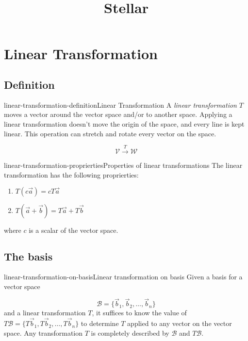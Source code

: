 \documentclass[preview]{standalone}
\begin{document}
\title{Stellar}
\genpage

\section{Linear Transformation}

\subsection{Definition}

\begin{snippetdefinition}{linear-transformation-definition}{Linear Transformation}
    A \textit{linear transformation} \(T\) moves a vector around the vector space and/or to another space.
    Applying a linear transformation doesn't move the origin of the space, and every line
    is kept linear. This operation can stretch and rotate every vector on the space.
    
    \[
        \mathcal{V} \xrightarrow{T} \mathcal{W}
    \]
\end{snippetdefinition}

\begin{snippetproposition}{linear-transformation-proprierties}{Properties of linear transformations}
    The linear transformation has the following proprierties:

    \begin{enumerate}
        \item \(T(c\vec{a})=cT\vec{a}\)
        \item \(T(\vec{a} + \vec{b}) = T\vec{a} + T\vec{b}\)
    \end{enumerate}
    
    where \(c\) is a scalar of the vector space.
\end{snippetproposition}

\subsection{The basis}


\begin{snippettheorem}{linear-transformation-on-basis}{Linear transformation on basis}
    Given a basis for a vector space

    \[
        \mathcal{B}=\{\vec{b}_1, \vec{b}_2, \ldots, \vec{b}_n\}
    \]
    and a linear transformation \(T\), it suffices
    to know the value of \(T\mathcal{B}=\{T\vec{b}_1, T\vec{b}_2, \ldots, T\vec{b}_n\}\)
    to determine \(T\) applied to any vector on the vector space.
    Any transformation \(T\) is completely described by \(\mathcal{B}\)
    and \(T\mathcal{B}\).
\end{snippettheorem}
\end{document}
